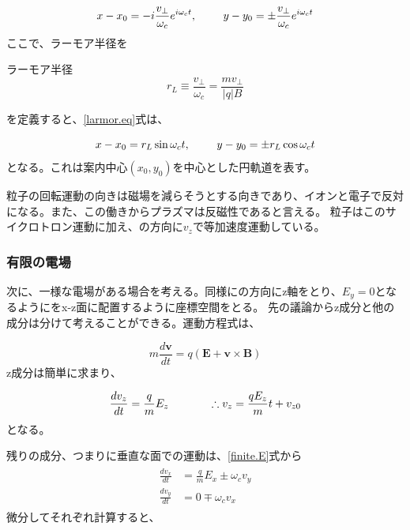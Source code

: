 \documentclass{ltjsarticle}
\numberwithin{equation}{section} %
\begin{document}
\begin{equation}
  x - x_0 = -i\frac{v_\perp}{\omega_c}e^{i\omega_c t}, \hspace{2pc} y -y_0 = \pm \frac{v_\perp}{\omega_c}e^{i\omega_c t} \label{larmor.eq}
\end{equation}
ここで、ラーモア半径を

\begin{eqbox}{ラーモア半径}
\begin{equation}
  r_L \equiv \frac{v_\perp}{\omega_c} = \frac{mv_\perp}{|q|B} \label{larmor.radi}
\end{equation}
\end{eqbox}  
を定義すると、\eqref{larmor.eq}式は、

\begin{equation}
  x - x_0 = r_L \sin \omega_c t, \hspace{2pc} y -y_0 = \pm r_L \cos \omega_c t \label{guiding_center_eq}
\end{equation}
となる。これは案内中心$(x_0, y_0)$を中心とした円軌道を表す。

粒子の回転運動の向きは磁場を減らそうとする向きであり、イオンと電子で反対になる。また、この働きからプラズマは反磁性であると言える。
粒子はこのサイクロトロン運動に加え、の方向に$v_z$で等加速度運動している。

\subsubsection{有限の電場}
次に、一様な電場がある場合を考える。同様にの方向にz軸をとり、$E_y=0$となるようにをx-z面に配置するように座標空間をとる。
先の議論からz成分と他の成分は分けて考えることができる。運動方程式は、

\begin{equation}
  m\frac{d\bm{v}}{dt} = q(\bm{E} + \bm{v}\times \bm{B}) \label{finite.E}
\end{equation}
z成分は簡単に求まり、

\begin{equation}
  \frac{dv_z}{dt} = \frac{q}{m}E_z \hspace{3pc} \therefore v_z = \frac{qE_z}{m}t + v_{z0}
\end{equation}
となる。

残りの成分、つまりに垂直な面での運動は、\eqref{finite.E}式から
\begin{align}
  \begin{split}
    \frac{dv_x}{dt} &= \frac{q}{m}E_x \pm \omega_c v_y\\
    \frac{dv_y}{dt} &= 0 \mp \omega_c v_x
  \end{split}
\end{align}
微分してそれぞれ計算すると、
\end{document}
